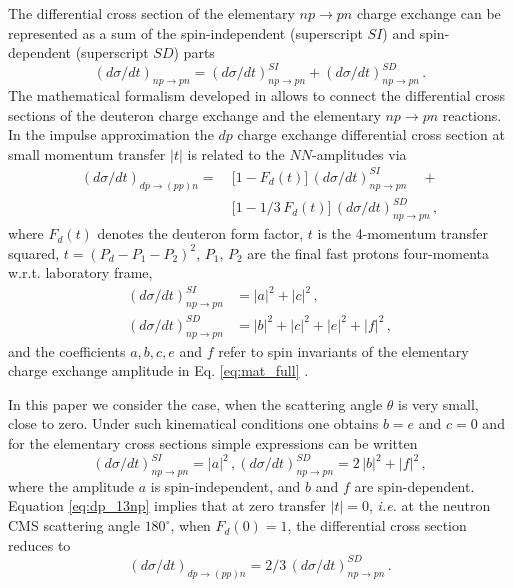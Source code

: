 \documentclass[twocolumn,epjc3]{svjour3}
\newcommand{\np}     {\ensuremath{np \rightarrow pn}\xspace}
\newcommand{\dpchex} {\ensuremath{dp \rightarrow (pp)n}\xspace}
\begin{document}

The differential cross section of the elementary \np charge exchange can be
represented as a sum of the spin-independent (superscript $SI$) and
spin-dependent (superscript $SD$) parts
\begin{equation}
  \label{eq:np_sum}
  (d\sigma/dt)_{\np} = (d\sigma/dt)^{SI}_{\np} + (d\sigma/dt)^{SD}_{\np}\,.
\end{equation}
The mathematical formalism developed in \cite{dea72, dea72_2, bug87} allows to
connect the differential cross sections of the deuteron charge exchange and the
elementary \np reactions. In the impulse approximation the $dp$ charge exchange
differential cross section at small momentum transfer $|t|$ is related to the
$NN$-amplitudes via
\begin{equation}
  \label{eq:dp_13np}
  \begin{split}
    (d\sigma/dt)_{\dpchex} =\ &\bigl[1 - F_d(t)\bigr]\,(d\sigma/dt)^{SI}_{\np}
    \quad + \\
    &\bigl[1 - 1/3\,F_d(t)\bigr]\,(d\sigma/dt)^{SD}_{\np}\,,
  \end{split}
\end{equation}
where $F_d(t)$ denotes the deuteron form factor, $t$ is the 4-mo\-mentum
transfer squared, $t = (P_d - P_1 - P_2)^2$, $P_1$, $P_2$ are the final fast
protons four-momenta w.r.t. laboratory frame,
\begin{equation}
  \begin{split}
    (d\sigma/dt)^{SI}_{\np} &= |a|^2 +|c|^2\,,\\
    (d\sigma/dt)^{SD}_{\np} &= |b|^2 + |c|^2 + |e|^2 + |f|^2\,,
  \end{split}
\end{equation}
and the coefficients $a, b, c, e$ and $f$ refer to spin invariants of the
elementary charge exchange amplitude in Eq. \eqref{eq:mat_full}
\cite{dea72,ala75_2}.

In this paper we consider the case, when the scattering angle $\theta$ is very
small, close to zero. Under such kinematical conditions one obtains $b = e$ and
$c = 0$ and for the elementary cross sections simple expressions can be written
\begin{equation}
  (d\sigma/dt)^{SI}_{\np} = |a|^2\,,
  (d\sigma/dt)^{SD}_{\np} = 2\,|b|^2 + |f|^2\,,
\end{equation}
where the amplitude $a$ is spin-independent, and $b$ and $f$ are spin-dependent.
Equation \eqref{eq:dp_13np} implies that at zero transfer $|t| = 0$,
\textit{i.e.} at the neutron CMS scattering angle $180^\circ$, when
$F_d(0) = 1$, the differential cross section reduces to
\begin{equation}
  \label{eq:dp_23np}
  (d\sigma/dt)_{\dpchex} = 2/3\,(d\sigma/dt)^{SD}_{\np}\,.
\end{equation}
\end{document}
